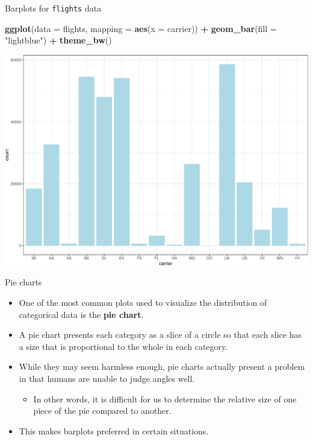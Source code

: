 \documentclass[
  ignorenonframetext,
]{beamer}
\newenvironment{Shaded}{\begin{snugshade}}{\end{snugshade}}
\newcommand{\AttributeTok}[1]{\textcolor[rgb]{0.13,0.29,0.53}{#1}}
\newcommand{\FunctionTok}[1]{\textcolor[rgb]{0.13,0.29,0.53}{\textbf{#1}}}
\newcommand{\NormalTok}[1]{#1}
\newcommand{\SpecialCharTok}[1]{\textcolor[rgb]{0.81,0.36,0.00}{\textbf{#1}}}
\newcommand{\StringTok}[1]{\textcolor[rgb]{0.31,0.60,0.02}{#1}}
\providecommand{\tightlist}{%
  \setlength{\itemsep}{0pt}\setlength{\parskip}{0pt}}
\begin{document}
\begin{frame}[fragile]{Barplots for \texttt{flights} data}
\protect\hypertarget{barplots-for-flights-data-1}{}
\tiny

\begin{Shaded}
\begin{Highlighting}[]
\FunctionTok{ggplot}\NormalTok{(}\AttributeTok{data =}\NormalTok{ flights, }\AttributeTok{mapping =} \FunctionTok{aes}\NormalTok{(}\AttributeTok{x =}\NormalTok{ carrier)) }\SpecialCharTok{+}
  \FunctionTok{geom\_bar}\NormalTok{(}\AttributeTok{fill =} \StringTok{"lightblue"}\NormalTok{) }\SpecialCharTok{+} 
  \FunctionTok{theme\_bw}\NormalTok{()}
\end{Highlighting}
\end{Shaded}

\begin{center}\includegraphics[width=0.9\linewidth,height=0.5\textheight]{Week2_Lect_files/figure-beamer/unnamed-chunk-39-1} \end{center}
\normalsize
\end{frame}

\begin{frame}{Pie charts}
\protect\hypertarget{pie-charts}{}
\begin{itemize}
\item
  One of the most common plots used to visualize the distribution of
  categorical data is the \textbf{pie chart}.
\item
  A pie chart presents each category as a slice of a circle so that each
  slice has a size that is proportional to the whole in each category.
\item
  While they may seem harmless enough, pie charts actually present a
  problem in that humans are unable to judge angles well.

  \begin{itemize}
  \tightlist
  \item
    In other words, it is difficult for us to determine the relative
    size of one piece of the pie compared to another.
  \end{itemize}
\item
  This makes barplots preferred in certain situations.
\end{itemize}
\end{frame}
\end{document}

